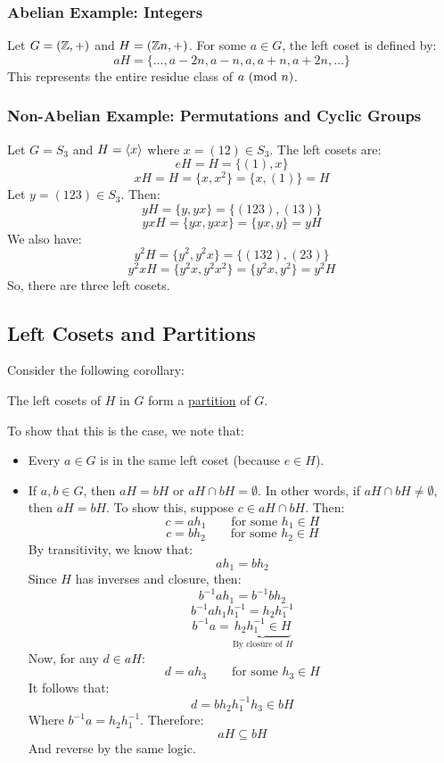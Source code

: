 \documentclass[letterpaper]{article}
\begin{document}
\subsubsection{Abelian Example: Integers}
Let $G = (\mathbb{Z}, +)$ and $H = (\mathbb{Z} n, +)$. For some $a \in G$, the left coset is defined by: 
\[aH = \{\dots, a - 2n, a - n, a, a + n, a + 2n, \dots\}\]
This represents the entire residue class of $a \ (\mathrm{mod}\ n)$. 

\subsubsection{Non-Abelian Example: Permutations and Cyclic Groups}
Let $G = S_3$ and $H = \langle x \rangle$ where $x = (12) \in S_3$. The left cosets are: 
\[eH = H = \{(1), x\}\]
\[xH = H = \{x, x^2\} = \{x, (1)\} = H\]
Let $y = (123) \in S_3$. Then: 
\[yH = \{y, yx\} = \{(123), (13)\}\]
\[yxH = \{yx, yxx\} = \{yx, y\} = yH\]
We also have: 
\[y^2 H = \{y^2, y^2 x\} = \{(132), (23)\}\]
\[y^2 x H = \{y^2 x, y^2 x^2\} = \{y^2 x, y^2\} = y^2 H\]
So, there are three left cosets. 

\subsection{Left Cosets and Partitions}
Consider the following corollary: 
\begin{corollary}{}{}
    The left cosets of $H$ in $G$ form a \underline{partition} of $G$. 
\end{corollary}
To show that this is the case, we note that: 
\begin{itemize}
    \item Every $a \in G$ is in the same left coset (because $e \in H$). 
    \item If $a, b \in G$, then $aH = bH$ or $aH \cap bH = \emptyset$. In other words, if $aH \cap bH \neq \emptyset$, then $aH = bH$. To show this, suppose $c \in aH \cap bH$. Then: 
    \[c = ah_1 \qquad \text{for some } h_1 \in H\]
    \[c = bh_2 \qquad \text{for some } h_2 \in H\]
    By transitivity, we know that: 
    \[ah_1 = bh_2\]
    Since $H$ has inverses and closure, then:
    \[b^{-1} ah_1 = b^{-1} b h_2\]
    \[b^{-1} ah_1 h_{1}^{-1} = h_2 h_{1}^{-1}\] 
    \[b^{-1} a = \underbrace{h_{2} h_{1}^{-1} \in H}_{\text{By closure of } H}\]
    Now, for any $d \in aH$: 
    \[d = ah_3 \qquad \text{for some } h_3 \in H\]
    It follows that:
    \[d = bh_2 h_{1}^{-1} h_3 \in bH\]
    Where $b^{-1} a = h_{2} h_{1}^{-1}$. Therefore: 
    \[aH \subseteq bH\]
    And reverse by the same logic. 
\end{itemize}
\end{document}
